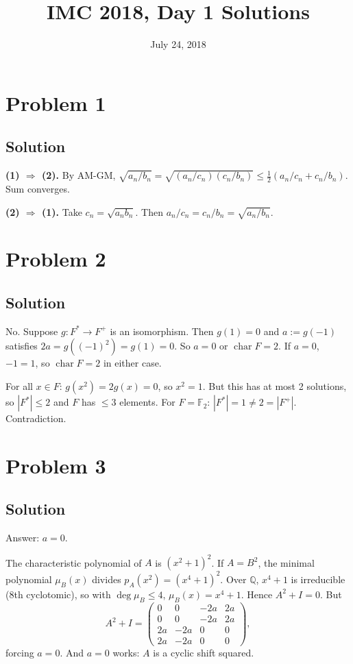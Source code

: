\documentclass{article}
\title{IMC 2018, Day 1 Solutions}
\date{July 24, 2018}
\begin{document}
\maketitle

\section*{Problem 1}
\subsection*{Solution}
\textbf{(1) $\Rightarrow$ (2).} By AM-GM, $\sqrt{a_n/b_n} = \sqrt{(a_n/c_n)(c_n/b_n)} \leq \tfrac{1}{2}(a_n/c_n + c_n/b_n)$. Sum converges.

\textbf{(2) $\Rightarrow$ (1).} Take $c_n = \sqrt{a_n b_n}$. Then $a_n/c_n = c_n/b_n = \sqrt{a_n/b_n}$.

\section*{Problem 2}
\subsection*{Solution}
No. Suppose $g: F^* \to F^+$ is an isomorphism. Then $g(1) = 0$ and $a := g(-1)$ satisfies $2a = g((-1)^2) = g(1) = 0$. So $a = 0$ or $\operatorname{char} F = 2$. If $a = 0$, $-1 = 1$, so $\operatorname{char} F = 2$ in either case.

For all $x \in F$: $g(x^2) = 2 g(x) = 0$, so $x^2 = 1$. But this has at most 2 solutions, so $|F^*| \leq 2$ and $F$ has $\leq 3$ elements. For $F = \mathbb{F}_2$: $|F^*| = 1 \neq 2 = |F^+|$. Contradiction.

\section*{Problem 3}
\subsection*{Solution}
Answer: $a = 0$.

The characteristic polynomial of $A$ is $(x^2 + 1)^2$. If $A = B^2$, the minimal polynomial $\mu_B(x)$ divides $p_A(x^2) = (x^4 + 1)^2$. Over $\mathbb{Q}$, $x^4 + 1$ is irreducible (8th cyclotomic), so with $\deg \mu_B \leq 4$, $\mu_B(x) = x^4 + 1$. Hence $A^2 + I = 0$. But
\[ A^2 + I = \begin{pmatrix} 0 & 0 & -2a & 2a \\ 0 & 0 & -2a & 2a \\ 2a & -2a & 0 & 0 \\ 2a & -2a & 0 & 0 \end{pmatrix}, \]
forcing $a = 0$. And $a = 0$ works: $A$ is a cyclic shift squared.
\end{document}
